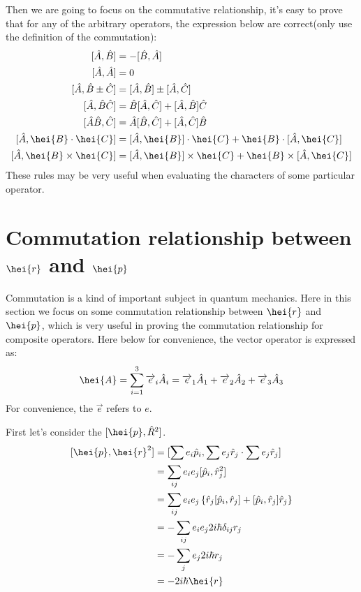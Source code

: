 Then we are going to focus on the commutative relationship, it's
easy to prove that for any of the arbitrary operators, the
expression below are correct(only use the definition of the
commutation):
\begin{align}\label{OPERATORMOREeq:4}
[\hat{A}, \hat{B}] &= -[\hat{B}, \hat{A}] \nonumber \\
[\hat{A}, \hat{A}] &= 0  \nonumber \\
[\hat{A}, \hat{B} \pm \hat{C}] &= [\hat{A}, \hat{B}] \pm  [\hat{A},
  \hat{C}] \nonumber \\
[\hat{A}, \hat{B}\hat{C}] &= \hat{B}[\hat{A}, \hat{C}] + [\hat{A},
  \hat{B}]\hat{C} \nonumber \\
[\hat{A}\hat{B}, \hat{C}] &= \hat{A}[\hat{B}, \hat{C}] + [\hat{A},
  \hat{C}]\hat{B} \nonumber \\
[\hat{A}, \hei{B}\cdot\hei{C}] &= [\hat{A}, \hei{B}]\cdot\hei{C} +
\hei{B}\cdot
  [\hat{A}, \hei{C}] \nonumber \\
[\hat{A}, \hei{B}\times\hei{C}] &= [\hat{A}, \hei{B}]\times\hei{C} +
\hei{B}\times
  [\hat{A}, \hei{C}]
\end{align}
These rules may be very useful when evaluating the characters of
some particular operator.

\section{Commutation relationship between $\hei{r}$ and $\hei{p}$}
%
%
%
Commutation is a kind of important subject in quantum mechanics.
Here in this section we focus on some commutation relationship
between $\hei{r}$ and $\hei{p}$, which is very useful in proving the
commutation relationship for composite operators. Here below for
convenience, the vector operator is expressed as:
\begin{equation}\label{}
\hei{A} = \sum_{i=1}^{3}\overrightarrow{e}_{i}\hat{A}_{i} =
\overrightarrow{e}_{1}\hat{A}_{1} +
\overrightarrow{e}_{2}\hat{A}_{2} +
\overrightarrow{e}_{3}\hat{A}_{3}
\end{equation}
For convenience, the $\overrightarrow{e}$ refers to $e$.

First let's consider the $[\hei{p}, \hat{R}^{2}]$.
\begin{align}\label{OPERATORMOREeq:6}
[\hei{p}, \hei{r}^{2}] &= [\sum e_{i}\hat{p}_{i}, \sum
e_{j}\hat{r}_{j} \cdot \sum e_{j}\hat{r}_{j}] \nonumber \\
&=\sum_{ij} e_{i}e_{j}[\hat{p}_{i}, \hat{r}_{j}^{2}] \nonumber \\
&=\sum_{ij} e_{i}e_{j}\left\{\hat{r}_{j}[\hat{p}_{i}, \hat{r}_{j}] +
[\hat{p}_{i}, \hat{r}_{j}]\hat{r}_{j} \right\} \nonumber \\
&=-\sum_{ij} e_{i}e_{j}2i\hbar\delta_{ij}r_{j} \nonumber \\
&=-\sum_{j} e_{j}2i\hbar r_{j} \nonumber \\
&=-2i\hbar\hei{r}
\end{align}

